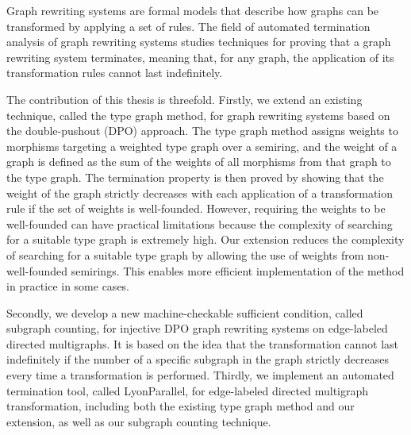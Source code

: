Graph rewriting systems are formal models that describe how graphs can be transformed by applying a set of rules. The field of automated termination analysis of graph rewriting systems studies techniques for proving that a graph rewriting system terminates, meaning that, for any graph, the application of its transformation rules cannot last indefinitely. 

The contribution of this thesis is threefold.
Firstly, we extend an existing technique, called the type graph method, for graph rewriting systems based on the double-pushout (DPO) approach. The type graph method assigns weights to morphisms targeting a weighted type graph over a semiring, and the weight of a graph is defined as the sum of the weights of all morphisms from that graph to the type graph. The termination property is then proved by showing that the weight of the graph strictly decreases with each application of a transformation rule if the set of weights is well-founded. However, requiring the weights to be well-founded can have practical limitations because the complexity of searching for a suitable type graph is extremely high.
Our extension reduces the complexity of searching for a suitable type graph by allowing the use of weights from non-well-founded semirings. This enables more efficient implementation of the method in practice in some cases.

Secondly, we develop a new machine-checkable sufficient condition, called subgraph counting, for injective DPO graph rewriting systems on edge-labeled directed multigraphs. It is based on the idea that the transformation cannot last indefinitely if the number of a specific subgraph in the graph strictly decreases every time a transformation is performed.
Thirdly, we implement an automated termination tool, called LyonParallel, for edge-labeled directed multigraph transformation, including both the existing
type graph method and our extension, as well as our subgraph counting technique. 








